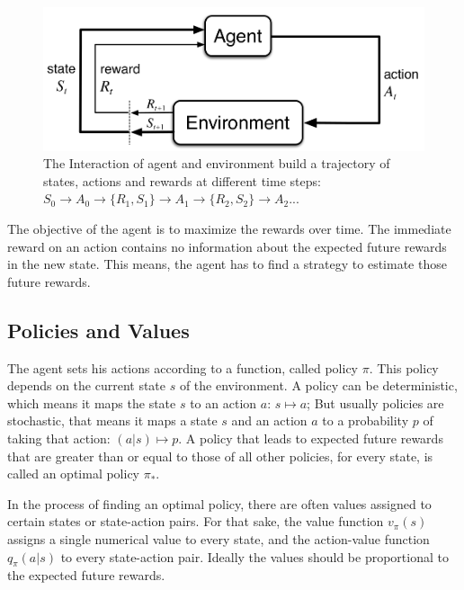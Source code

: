 \documentclass[paper=a4, fontsize=11pt]{scrartcl} %
\numberwithin{equation}{section} %
\numberwithin{figure}{section} %
\numberwithin{table}{section} %
\begin{document}
\begin{figure}[H]
\centering
\includegraphics[width=0.6\columnwidth]{Images/AgentEnvironment.png}
\caption{ \cite{SuttonBarto} The Interaction of agent and environment build a trajectory of states, actions and rewards at different time steps: $S_0 \rightarrow A_0 \rightarrow \{ R_{1}, S_1 \} \rightarrow A_1 \rightarrow \{ R_{2}, S_2 \} \rightarrow A_2 ...$}
\label{fig:agentenv}
\end{figure}

	The objective of the agent is to maximize the rewards over time.  The immediate reward on an action contains no information about the expected future rewards in the new state. This means, the agent has to find a strategy to estimate those future rewards.

\subsection{Policies and Values}

	The agent sets his actions according to a function, called policy $\pi$. This policy depends on the current state $s$ of the environment. A policy can be deterministic, which means it maps the state $s$ to an action $a$: $s \mapsto a$; But usually policies are stochastic, that means it maps a state $s$ and an action $a$ to a probability $p$ of taking that action: $(a|s) \mapsto p$. A policy that leads to expected future rewards that are greater than or equal to those of all other policies, for every state, is called an optimal policy $\pi_*$.

	In the process of finding an optimal policy, there are often values assigned to certain states or state-action pairs. For that sake, the value function $v_\pi(s)$ assigns a single numerical value to every state, and the action-value function $q_\pi(a|s)$ to every state-action pair. Ideally the values should be proportional to the expected future rewards. 
\end{document}
